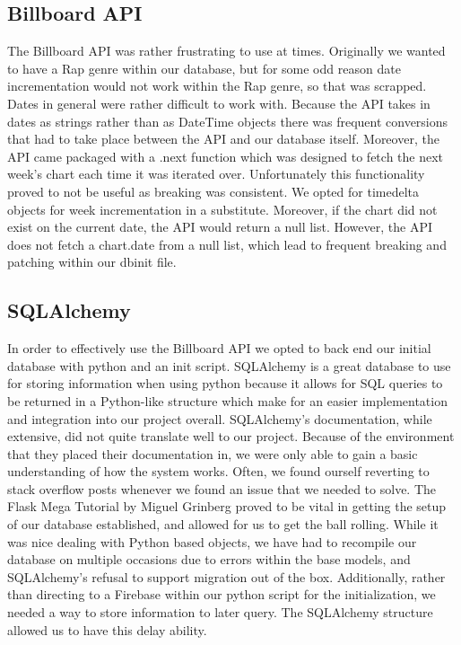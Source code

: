 \documentclass{article}
\begin{document}
\subsection*{Billboard API}
The Billboard API was rather frustrating to use at times.
Originally we wanted to have a Rap genre within our database, but for some odd reason date incrementation would not work within the Rap genre, so that was scrapped.
Dates in general were rather difficult to work with.
Because the API takes in dates as strings rather than as DateTime objects there was frequent conversions that had to take place between the API and our database itself.
Moreover, the API came packaged with a .next function which was designed to fetch the next week's chart each time it was iterated over.
Unfortunately this functionality proved to not be useful as breaking was consistent.
We opted for timedelta objects for week incrementation in a substitute. 
Moreover, if the chart did not exist on the current date, the API would return a null list.
However, the API does not fetch a chart.date from a null list, which lead to frequent breaking and patching within our dbinit file. 
\subsection*{SQLAlchemy}
In order to effectively use the Billboard API we opted to back end our initial database with python and an init script. SQLAlchemy is a great database to use for storing information when using python because it allows for SQL queries to be returned in a Python-like structure which make for an easier implementation and integration into our project overall.
SQLAlchemy's documentation, while extensive, did not quite translate well to our project.
Because of the environment that they placed their documentation in, we were only able to gain a basic understanding of how the system works.
Often, we found ourself reverting to stack overflow posts whenever we found an issue that we needed to solve.
The Flask Mega Tutorial by Miguel Grinberg proved to be vital in getting the setup of our database established, and allowed for us to get the ball rolling.
While it was nice dealing with Python based objects, we have had to recompile our database on multiple occasions due to errors within the base models, and SQLAlchemy's refusal to support migration out of the box.
Additionally, rather than directing to a Firebase within our python script for the initialization, we needed a way to store information to later query. 
The SQLAlchemy structure allowed us to have this delay ability. 
\end{document}
